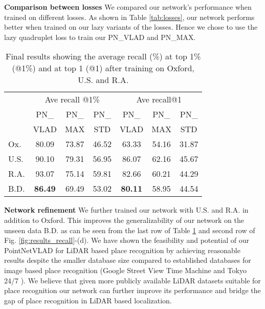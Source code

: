 \documentclass[10pt,twocolumn,letterpaper]{article}
\begin{document}
\noindent\textbf{Comparison between losses} We compared our network's performance when trained on different losses. As shown in Table \ref{tab:losses}, our network performs better when trained on our lazy variants of the losses. Hence we chose to use the lazy quadruplet loss to train our PN\_VLAD and PN\_MAX. 
\newline
\begin{table}
	\begin{center}
		\begin{tabular}{|l|c|c|c|c|c|c|}
			\hline
			&\multicolumn{3}{c|}{Ave recall @1\%}&\multicolumn{3}{c|}{Ave recall@1}\\
			\cline{2-7}
			&\small{PN\_}&\small{PN\_}&\small{PN\_}&\small{PN\_}&\small{PN\_}&\small{PN\_}\\
			&\small{VLAD}&\small{MAX}&\small{STD}&\small{VLAD}&\small{MAX}&\small{STD}\\
			\hline
			\small{Ox.}&80.09&73.87&46.52&63.33&54.16&31.87\\
			\hline
			\small{U.S.}&90.10&79.31&56.95&86.07&62.16&45.67\\
			\hline
			\small{R.A.}&93.07&75.14&59.81&82.66&60.21&44.29\\
			\hline
			\small{B.D.}&\textbf{86.49}&69.49&53.02&\textbf{80.11}&58.95&44.54\\
			\hline									
		\end{tabular}
	\end{center}
\caption{Final results showing the average recall (\%) at top 1\% (@1\%) and at top 1 (@1) after training on Oxford, U.S. and R.A.\vspace{-0.4cm}}
	\label{tab:final}
\end{table}
\vspace{-0.2cm}

\noindent\textbf{Network refinement} We further trained our network with U.S. and R.A. in addition to Oxford. 
This improves the generalizability of our network on the unseen data B.D. as can be seen from the last row of 
Table \ref{tab:final}  and second row of Fig. \ref{fig:results_recall}-(d).
We have shown the feasibility and potential of our PointNetVLAD for LiDAR based place recognition by achieving reasonable results despite the smaller database size compared to established databases for image based place recognition (\eg Google Street View Time Machine and Tokyo 24/7 \cite{Akihiko:2015}). We believe that given more publicly available LiDAR datasets suitable for place recognition our network can further improve its performance and bridge the gap of place recognition in LiDAR based localization.
\newline
\end{document}
